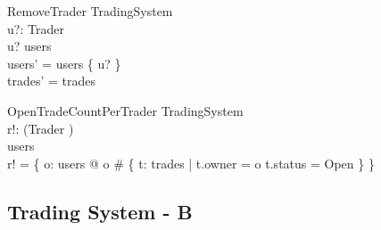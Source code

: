 \documentclass{article}
\begin{document}
\vspace{-0.1cm} 

\begin{schema}{RemoveTrader}
\Delta TradingSystem \\
u?: Trader \\ 
\where
u? \in users \\
users' = users \setminus \{ u? \} \\
trades' = trades \\
\end{schema}

\vspace{-0.1cm} 

\begin{schema}{OpenTradeCountPerTrader}
\Xi TradingSystem \\
r!: \power (Trader \cross \nat) \\ 
\where
users \neq \emptyset \\
r! = \{ o: users @ o \mapsto \# \{ t: \ran trades | t.owner = o \land t.status = Open \} \} \\
\end{schema}

\subsection*{Trading System - B}
\end{document}
